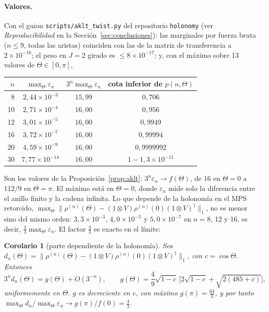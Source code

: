 \documentclass[11pt,a4paper]{article}
\newtheorem{corolario}[teorema]{Corolario}
\theoremstyle{remark}
\begin{document}
\paragraph{Valores.} Con el guion \texttt{scripts/aklt\_twist.py} del repositorio \texttt{holonomy} (ver
\emph{Reproducibilidad} en la Sección~\ref{sec:conclusiones}): las marginales por fuerza bruta ($n\le9$, todas las aristas) coinciden con las
de la matriz de transferencia a $2\times10^{-16}$; el peso en $J=2$ girado es $\le8\times10^{-17}$;
y, con el máximo sobre 13 valores de $\Theta\in[0,\pi]$,
\begin{center}\small
\begin{tabular}{rccc}
\toprule
$n$ & $\max_\Theta\varepsilon_n$ & $3^n\max_\Theta\varepsilon_n$ & cota inferior de $p(n,\Theta)$\\
\midrule
8 & $2{,}44\times10^{-3}$ & $15{,}99$ & $0{,}706$\\
10 & $2{,}71\times10^{-4}$ & $16{,}00$ & $0{,}956$\\
12 & $3{,}01\times10^{-5}$ & $16{,}00$ & $0{,}9949$\\
16 & $3{,}72\times10^{-7}$ & $16{,}00$ & $0{,}99994$\\
20 & $4{,}59\times10^{-9}$ & $16{,}00$ & $0{,}9999992$\\
30 & $7{,}77\times10^{-14}$ & $16{,}00$ & $1-1{,}3\times10^{-11}$\\
\bottomrule
\end{tabular}
\end{center}
Son los valores de la Proposición~\ref{prop:aklt}: $3^n\varepsilon_n\to f(\Theta)$, de $16$ en
$\Theta=0$ a $112/9$ en $\Theta=\pi$. El máximo está en $\Theta=0$, donde $\varepsilon_n$ mide solo la diferencia entre el
anillo finito y la cadena infinita. Lo que depende de la holonomía en el MPS retorcido,
$\max_\Theta\|\rho^{(n)}(\Theta)-(1\otimes V)\rho^{(n)}(0)(1\otimes V)^\dagger\|_1$, no es menor
sino del mismo orden: $3{,}3\times10^{-3}$, $4{,}0\times10^{-5}$ y $5{,}0\times10^{-7}$ en $n=8$, 12
y 16, es decir, $\tfrac43\max_\Theta\varepsilon_n$. El factor $\tfrac43$ es exacto en el límite:

\begin{corolario}[parte dependiente de la holonomía]\label{cor:aklt43}
Sea $d_n(\Theta)=\|\rho^{(n)}(\Theta)-(1\otimes V)\rho^{(n)}(0)(1\otimes V)^\dagger\|_1$, con
$c=\cos\Theta$. Entonces
\[
  3^n d_n(\Theta)=g(\Theta)+O(3^{-n}),\qquad
  g(\Theta)=\frac49\sqrt{1-c}\,\Big[2\sqrt{1-c}+\sqrt{2(485+c)}\Big],
\]
uniformemente en $\Theta$. $g$ es decreciente en $c$, con máximo $g(\pi)=\tfrac{64}3$, y por tanto
$\max_\Theta d_n/\max_\Theta\varepsilon_n\to g(\pi)/f(0)=\tfrac43$.
\end{corolario}
\end{document}
